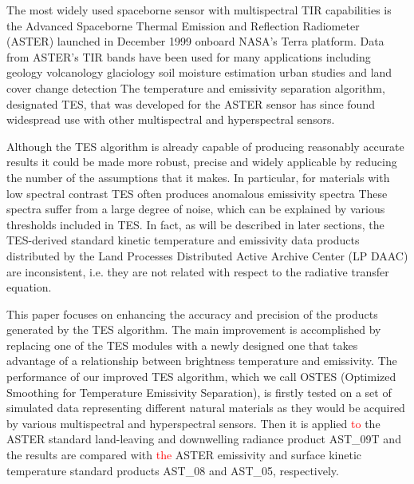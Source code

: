 The most widely used spaceborne sensor with multispectral TIR capabilities is the Advanced Spaceborne Thermal Emission and Reflection Radiometer (ASTER) launched in December 1999 onboard NASA's Terra platform. Data from ASTER's TIR bands have been used for many applications including 
geology 
volcanology 
glaciology 
soil moisture estimation 
urban studies 
and land cover change detection 
The temperature and emissivity separation algorithm, designated TES, that was developed for the ASTER sensor 
has since found widespread use with other multispectral and hyperspectral sensors.

Although the TES algorithm is already capable of producing reasonably accurate results it could be made more robust, precise and widely applicable by reducing the number of the assumptions that it makes. In particular, for materials with low spectral contrast TES often produces anomalous emissivity spectra 
These spectra suffer from a large degree of noise, which can be explained by various thresholds included in TES. In fact, as will be described in later sections, the TES-derived standard kinetic temperature and emissivity data products distributed by the Land Processes Distributed Active Archive Center (LP DAAC) are inconsistent, i.e. they are not related with respect to the radiative transfer equation.

This paper focuses on enhancing the accuracy and precision of the products generated by the TES algorithm. The main improvement is accomplished by replacing one of the TES modules with a newly designed one that takes advantage of a relationship between brightness temperature and emissivity. The performance of our improved TES algorithm, which we call OSTES (Optimized Smoothing for Temperature Emissivity Separation), is firstly tested on a set of simulated data representing different natural materials as they would be acquired by various multispectral and hyperspectral sensors. Then it is applied \textcolor{red}{to} the ASTER standard land-leaving and downwelling radiance product AST\_09T and the results are compared with \textcolor{red}{the} ASTER emissivity and surface kinetic temperature standard products AST\_08 and AST\_05, respectively.

